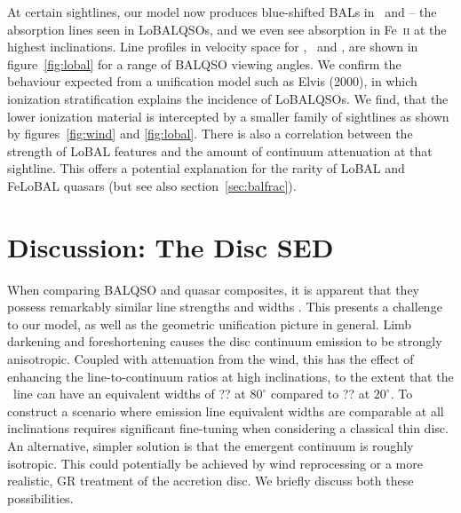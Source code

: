 \documentclass[preprint, a4paper, 11pt]{aastex}
\begin{document}
At certain sightlines, our model now produces blue-shifted BALs in \al\ and \mg --
the absorption lines seen in LoBALQSOs, and we even see absorption in Fe~\textsc{ii}
at the highest inclinations. Line profiles in velocity space 
for \civ, \al\ and \mg, are shown in figure~\ref{fig:lobal} for a range
of BALQSO viewing angles. We confirm the behaviour expected from 
a unification model such as Elvis (2000), in which ionization stratification
explains the incidence of LoBALQSOs. We find, that the lower
ionization material is intercepted by a smaller family of sightlines as shown by 
figures~\ref{fig:wind} and \ref{fig:lobal}.
There is also a correlation between the strength of LoBAL features
and the amount of continuum attenuation at that sightline. 
This offers a potential explanation for the rarity of LoBAL and
FeLoBAL quasars (but see also section~\ref{sec:balfrac}).









\section{Discussion: The Disc SED}

When comparing BALQSO and quasar composites, it is apparent
that they possess remarkably similar line strengths and widths 
\citep[e.g.][]{reichard2003}.
This presents a challenge to our model, as well as the geometric 
unification picture in general.
Limb darkening and foreshortening causes the disc continuum emission to be 
strongly anisotropic. Coupled with attenuation from the wind, 
this has the effect of enhancing the 
line-to-continuum ratios at high inclinations, to the extent
that the \civ\ line can have an equivalent widths of ?? at $80^\circ$
compared to ?? at $20^\circ$. To construct a scenario where emission 
line equivalent widths are comparable at all inclinations requires 
significant fine-tuning when considering a classical thin disc. 
An alternative, simpler solution is that the emergent continuum is roughly isotropic.
This could potentially be achieved by wind reprocessing or a more realistic, GR treatment
of the accretion disc. We briefly discuss both these possibilities.
\end{document}
